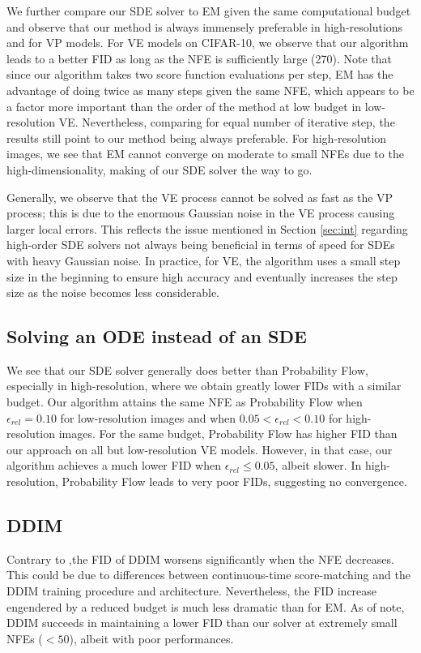 \documentclass{article}
\begin{document}
We further compare our SDE solver to EM given the same computational budget and observe that our method is always immensely preferable in high-resolutions and for VP models. For VE models on CIFAR-10, we observe that our algorithm leads to a better FID as long as the NFE is sufficiently large (270).
Note that since our algorithm takes two score function evaluations per step, EM has the advantage of doing twice as many steps given the same NFE, which appears to be a factor more important than the order of the method at low budget in low-resolution VE. 
Nevertheless, comparing for equal number of iterative step, the results still point to our method being always preferable.
For high-resolution images, we see that EM cannot converge on moderate to small NFEs due to the high-dimensionality, making of our SDE solver the way to go.


Generally, we observe that the VE process cannot be solved as fast as the VP process; this is due to the enormous Gaussian noise in the VE process causing larger local errors. This reflects the issue mentioned in Section \ref{sec:int} regarding high-order SDE solvers not always being beneficial in terms of speed for SDEs with heavy Gaussian noise. In practice, for VE, the algorithm uses a small step size in the beginning to ensure high accuracy and eventually increases the step size as the noise becomes less considerable.

\subsection{Solving an ODE instead of an SDE} We see that our SDE solver generally does better than Probability Flow, especially in high-resolution, where we obtain greatly lower FIDs with a similar budget. Our algorithm attains the same NFE as Probability Flow when $\epsilon_{rel}=0.10$ for low-resolution images and when $ 0.05 < \epsilon_{rel} < 0.10$ for high-resolution images. For the same budget, Probability Flow has higher FID than our approach on all but low-resolution VE models. However, in that case, our algorithm achieves a much lower FID when $\epsilon_{rel} \leq 0.05$, albeit slower. In high-resolution, Probability Flow leads to very poor FIDs, suggesting no convergence.

\subsection{DDIM} Contrary to \citet{song2020denoising},the FID of DDIM worsens significantly when the NFE decreases. This could be due to differences between \citet{song2020score} continuous-time score-matching and the DDIM training procedure and architecture. Nevertheless, the FID increase engendered by a reduced budget is much less dramatic than for EM. As of note, DDIM succeeds in maintaining a lower FID than our solver at extremely small NFEs ($< 50$), albeit with poor performances.
\end{document}
